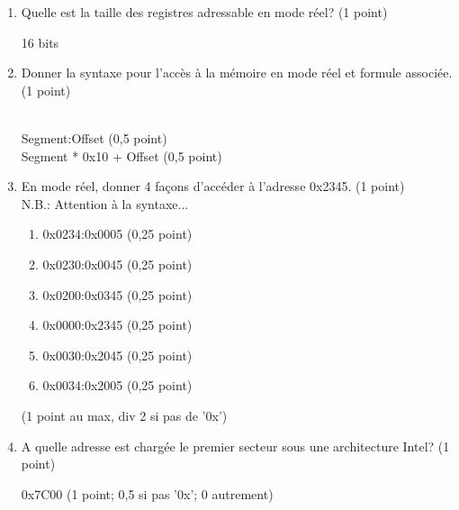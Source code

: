 \begin{enumerate}

\item Quelle est la taille des registres adressable en mode réel? (1 point)

\begin{correction}
16 bits
\end{correction}



\item Donner la syntaxe pour l'accès à la mémoire en mode réel et formule associée. (1 point)

\begin{correction}\\
Segment:Offset (0,5 point) \\
Segment * 0x10 + Offset (0,5 point)\\
\end{correction}

\item En mode réel, donner 4 façons d'accéder à l'adresse 0x2345. (1 point) \\
N.B.: Attention à la syntaxe...

\begin{correction}
\begin{enumerate}
\item 0x0234:0x0005 (0,25 point)
\item 0x0230:0x0045 (0,25 point)
\item 0x0200:0x0345 (0,25 point)
\item 0x0000:0x2345 (0,25 point)
\item 0x0030:0x2045 (0,25 point)
\item 0x0034:0x2005 (0,25 point)
\end{enumerate}
(1 point au max, div 2 si pas de '0x')\\
\end{correction}


\item A quelle adresse est chargée le premier secteur sous une architecture Intel? (1 point)

\begin{correction}
 0x7C00 (1 point; 0,5 si pas '0x'; 0 autrement)
\end{correction}

\end{enumerate}

